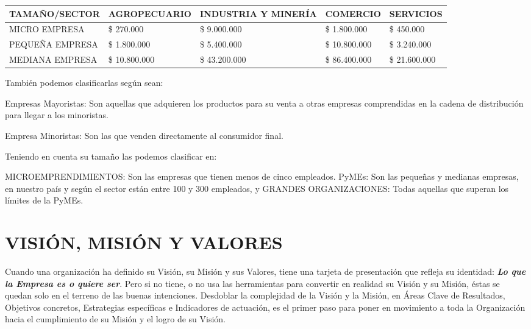 \begin{center}
\small
\begin{tabular}{|p{}|p{}|p{}|p{}|p{}|}
\hline
TAMAÑO/SECTOR & AGROPECUARIO & INDUSTRIA Y MINERÍA & COMERCIO & SERVICIOS \\ \hline
MICRO EMPRESA & \$ 270.000 & \$ 9.000.000 & \$ 1.800.000 & \$ 450.000 \\ \hline
PEQUEÑA EMPRESA & \$ 1.800.000 & \$ 5.400.000 & \$ 10.800.000 & \$ 3.240.000 \\ \hline
MEDIANA EMPRESA & \$ 10.800.000 & \$ 43.200.000 & \$ 86.400.000 & \$ 21.600.000 \\ \hline
\end{tabular}
\end{center}

También podemos clasificarlas según sean:

Empresas Mayoristas: Son aquellas que adquieren los productos para su venta a otras empresas comprendidas en la cadena de distribución para llegar a los minoristas.

Empresa Minoristas: Son las que venden directamente al consumidor final.

Teniendo en cuenta su tamaño las podemos clasificar en:

MICROEMPRENDIMIENTOS: Son las empresas que tienen menos de cinco empleados. PyMEs: Son las pequeñas y medianas empresas, en nuestro país y según el sector están entre 100 y 300 empleados, y GRANDES ORGANIZACIONES: Todas aquellas que superan los límites de la PyMEs.



\section*{VISIÓN, MISIÓN Y VALORES}
Cuando una organización ha definido su Visión, su Misión y sus Valores, tiene una tarjeta de presentación que refleja su identidad: \textbf{\textit{Lo que la Empresa es o quiere ser}}. Pero si no tiene, o no usa las herramientas para convertir en realidad su Visión y su Misión, éstas se quedan solo en el terreno de las buenas intenciones. Desdoblar la complejidad de la Visión y la Misión, en Áreas Clave de Resultados, Objetivos concretos, Estrategias específicas e Indicadores de actuación, es el primer paso para poner en movimiento a toda la Organización hacia el cumplimiento de su Misión y el logro de su Visión.

